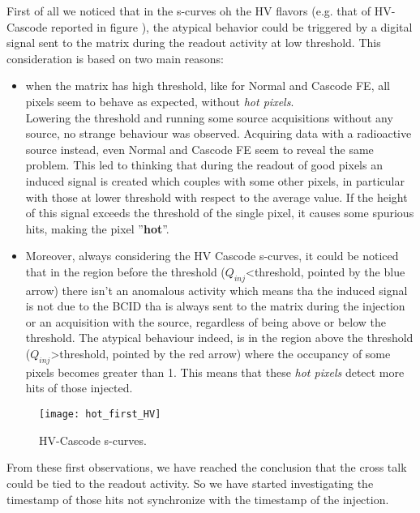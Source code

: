 First of all we noticed that in the s-curves oh the HV flavors (e.g. that of HV-Cascode reported in figure ), the atypical behavior could be triggered by a digital signal sent to the matrix during the readout activity at low threshold. This consideration is based on two main reasons:

\begin{itemize}
\item when the matrix has high threshold, like for Normal and Cascode FE, all pixels seem to behave as expected, without \textit{hot pixels}.\\ Lowering the threshold and running some source acquisitions without any source, no strange behaviour was observed. Acquiring data with a radioactive source instead, even Normal and Cascode FE seem to reveal the same problem. This led to thinking that during the readout of good pixels an induced signal is created which couples with some other pixels, in particular with those at lower threshold with respect to the average value. If the height of this signal exceeds the threshold of the single pixel, it causes some spurious hits, making the pixel ''\textbf{hot}''.

\item Moreover, always considering the HV Cascode s-curves, it could be noticed that in the region before the threshold ($Q_{inj}$<threshold, pointed by the blue arrow) there isn't an anomalous activity which means tha the induced signal is not due to the BCID tha is always sent to the matrix during the injection or an acquisition with the source, regardless of being above or below the  threshold. The atypical behaviour indeed, is in the region above the threshold ($Q_{inj}$>threshold, pointed by the red arrow) where the occupancy of some pixels becomes greater than 1. This means that these \textit{hot pixels} detect more hits of those injected.

\end{itemize} 

\begin{figure}[h!]
\centering
\texttt{[image: hot\_first\_HV]}
\caption{HV-Cascode s-curves.}
\label{fig:hot_first}
\end{figure}

From these first observations, we have reached the conclusion that the cross talk could be tied to the readout activity. So we have started investigating the timestamp of those hits not synchronize with the timestamp of the injection.


